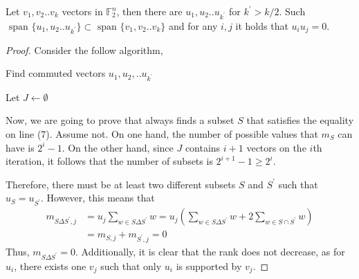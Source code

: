 \documentclass[manuscript,screen,review]{acmart}
\begin{document}
\fi
  \begin{claim}
    \label{claim:find}
    Let $v_{1},v_{2}..v_{k}$ vectors in $\mathbb{F}_{2}^{n}$, then there are $u_{1},u_{2}..u_{k^{\prime}}$ for $k^{\prime} > k/2$. Such $\text{ span } \{   u_{1},u_{2}..u_{k^{\prime}} \} \subset \text{ span } \{ v_{1},v_{2}..v_{k} \}$ and for any $i,j$ it holds that $u_{i}u_{j} = 0$. 
  \end{claim}
  \begin{proof}
    Consider the follow algorithm, 

    \begin{algorithm}[H]
      \caption{ Find commuted vectors $u_{1}, u_{2}, .. u_{k^{\prime}}$  }
      \label{alg:pick}
      Let $ J \leftarrow \emptyset$ \\
    \end{algorithm}
    
    Now, we are going to prove that  always finds a subset $S$ that satisfies the equality on line (7). Assume not. On one hand, the number of possible values that $m_{S}$ can have is $2^{i} - 1$. On the other hand, since $J$ contains $i+1$ vectors on the $i$th iteration, it follows that the number of subsets is $ 2^{i+1}-1 \ge 2^{i}$.

Therefore, there must be at least two different subsets $S$ and $S^{\prime}$ such that $u_{S}=u_{S^{\prime}}$. However, this means that 
    \begin{equation*}
      \begin{split}
      m_{S\Delta S^{\prime}, j} &= u_{j} \sum_{w\in S\Delta S^{\prime}}w = u_{j}\left(  \sum_{w\in S\Delta S^{\prime}}w + 2 \sum_{w \in S\cap S^{\prime}}w\right) \\ 
      & = m_{S,j} +m_{S^{\prime},j} = 0 
      \end{split}
    \end{equation*}
Thus, $m_{S\Delta S^{\prime}} = 0$. Additionally, it is clear that the rank does not decrease, as for $u_{i}$, there exists one $v_{j}$ such that only $u_{i}$ is supported by $v_{j}$.
  \end{proof}
\end{document}
